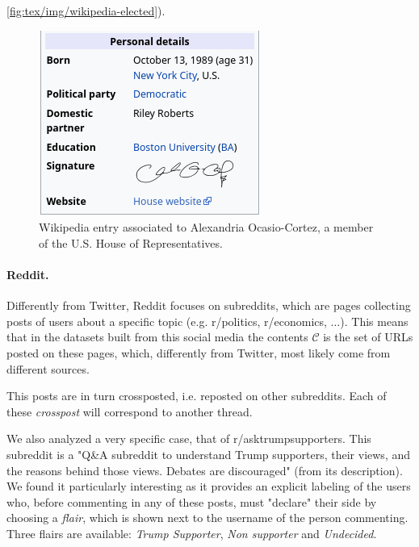 
\autoref{fig:tex/img/wikipedia-elected}).
\begin{figure}
	\centering
	\includegraphics[width=0.4\linewidth]{tex/img/wikipedia-elected.png}
	\caption[Example Wikipedia entry]{Wikipedia entry associated to Alexandria Ocasio-Cortez, a member
		of the U.S. House of Representatives.}%
	\label{fig:tex/img/wikipedia-elected}
\end{figure}

\paragraph{Reddit.}%
\label{par:reddit}

Differently from Twitter, Reddit focuses on subreddits, which are pages
collecting posts of users about a specific topic (e.g. r/politics,
r/economics, $\dots$). This means that
in the datasets built from this social media the contents $\mathcal{C} $ is the
set of URLs posted on these pages, which, differently from Twitter, most likely
come from different sources.

This posts are in turn crossposted, i.e. reposted on other subreddits. Each of
these \emph{crosspost} will correspond to another thread.

We also analyzed a
very specific case, that of r/asktrumpsupporters. This subreddit is a "Q\&A
subreddit to understand Trump supporters, their views, and the reasons behind
those views. Debates are discouraged" (from its description). We found it particularly interesting as it provides an explicit labeling of the
users who, before commenting in any of these posts, must "declare" their side
by choosing a \emph{flair}, which is shown next to the username of the person
commenting.  Three flairs are available: \emph{Trump Supporter}, \emph{Non
	supporter} and \emph{Undecided}.

